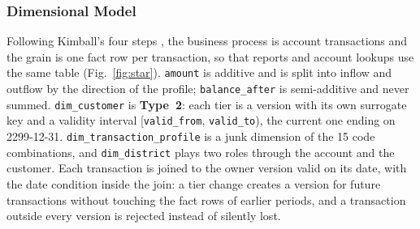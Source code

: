 \documentclass[peerreview]{IEEEtran}
\newcommand{\tbl}[1]{\texttt{#1}}
\begin{document}
\subsubsection{Dimensional Model}
Following Kimball's four steps \cite{kimball2013}, the business process is account
transactions and the grain is one fact row per transaction, so that reports and account
lookups use the same table (Fig.~\ref{fig:star}). \tbl{amount} is additive and is split into
inflow and outflow by the direction of the profile; \tbl{balance\_after} is semi-additive and
never summed. \tbl{dim\_customer} is \textbf{Type~2}: each tier is a version with its own
surrogate key and a validity interval [\tbl{valid\_from}, \tbl{valid\_to}), the current one
ending on 2299-12-31. \tbl{dim\_transaction\_profile} is a junk dimension of the 15 code
combinations, and \tbl{dim\_district} plays two roles through the account and the customer.
Each transaction is joined to the owner version valid on its date, with the date condition
inside the join: a tier change creates a version for future transactions without touching the
fact rows of earlier periods, and a transaction outside every version is rejected instead of
silently lost.
\end{document}
